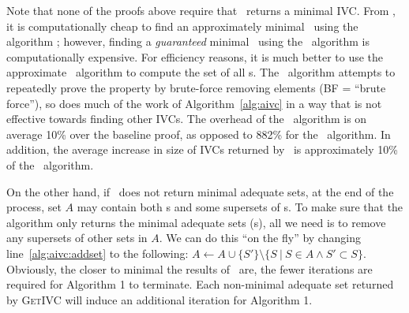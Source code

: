 \begin{IEEEproof}
%
%
%
\end{IEEEproof}

Note that none of the proofs above require that \getivc\ returns a minimal IVC.
From \cite{Ghass16}, it is computationally cheap to find an
approximately minimal \ivc\ using the algorithm \ucalg; however, finding a {\em guaranteed}
minimal \ivc\ using the \ucbfalg\ algorithm is computationally expensive.  For efficiency
reasons, it is much better to use the approximate \ucalg\ algorithm to compute the set of
all \mivc s.  The \ucbfalg\ algorithm attempts to repeatedly prove the property by brute-force removing elements (BF = ``brute force''), so does much of the work of Algorithm~\ref{alg:aivc} in a way that is not effective towards finding other IVCs.  The overhead of the \ucalg\ algorithm is on average 10\% over the baseline proof, as opposed to 882\% for the \ucbfalg\ algorithm.  In addition, the average increase in size of IVCs returned by \ucalg\ is approximately 10\% of the \ucbfalg\ algorithm.

On the other hand, if \getivc ~does not return minimal adequate sets, at the end of the process,
set $A$ may contain both \mivc s and some supersets of \mivc s. To make sure that the algorithm only returns
the minimal adequate sets (\mivc s), all we need is to remove any supersets of other sets in $A$.  We can do this ``on the fly'' by changing
line~\ref{alg:aivc:addset} to the following:
$A \leftarrow A \cup \{S'\} \setminus \{ S~|~S \in A \wedge S' \subset S \}$.
Obviously, the closer to minimal the results of \getivc ~are,
the fewer iterations are required for Algorithm 1 to terminate.  Each non-minimal adequate set returned by \textsc{GetIVC} will induce an additional iteration for Algorithm 1.



%



